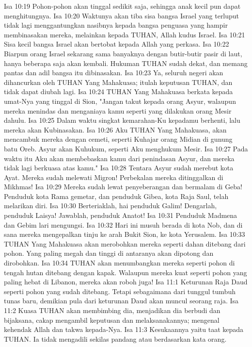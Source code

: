 Isa 10:19  Pohon-pohon akan tinggal sedikit saja, sehingga anak kecil pun dapat menghitungnya.
Isa 10:20  Waktunya akan tiba sisa bangsa Israel yang terluput tidak lagi menggantungkan nasibnya kepada bangsa penguasa yang hampir membinasakan mereka, melainkan kepada TUHAN, Allah kudus Israel.
Isa 10:21  Sisa kecil bangsa Israel akan bertobat kepada Allah yang perkasa.
Isa 10:22  Biarpun orang Israel sekarang sama banyaknya dengan butir-butir pasir di laut, hanya beberapa saja akan kembali. Hukuman TUHAN sudah dekat, dan memang pantas dan adil bangsa itu dibinasakan.
Isa 10:23  Ya, seluruh negeri akan dihancurkan oleh TUHAN Yang Mahakuasa; itulah keputusan TUHAN, dan tidak dapat diubah lagi.
Isa 10:24  TUHAN Yang Mahakuasa berkata kepada umat-Nya yang tinggal di Sion, "Jangan takut kepada orang Asyur, walaupun mereka menindas dan menganiaya kamu seperti yang dilakukan orang Mesir dahulu.
Isa 10:25  Dalam waktu singkat kemarahan-Ku kepadamu berhenti, lalu mereka akan Kubinasakan.
Isa 10:26  Aku TUHAN Yang Mahakuasa, akan mencambuk mereka dengan cemeti, seperti Kuhajar orang Midian di gunung batu Oreb. Asyur akan Kuhukum, seperti Aku menghukum Mesir.
Isa 10:27  Pada waktu itu Aku akan membebaskan kamu dari penindasan Asyur, dan mereka tidak lagi berkuasa atas kamu."
Isa 10:28  Tentara Asyur sudah merebut kota Ayat. Mereka sudah melewati Migron! Perbekalan mereka ditinggalkan di Mikhmas!
Isa 10:29  Mereka sudah lewat penyeberangan dan bermalam di Geba! Penduduk kota Rama gemetar, dan penduduk Gibea, kota Raja Saul, telah melarikan diri.
Isa 10:30  Berteriaklah, hai penduduk Galim! Dengarlah, penduduk Laisya! Jawablah, penduduk Anatot!
Isa 10:31  Penduduk Madmena dan Gebim lari mengungsi.
Isa 10:32  Hari ini musuh berada di kota Nob, dan di sana mereka mengepalkan tinju ke arah Bukit Sion, ke kota Yerusalem.
Isa 10:33  TUHAN Yang Mahakuasa akan merobohkan mereka seperti dahan ditebang dari pohon. Yang paling megah dan tinggi di antaranya akan dipotong dan dirobohkan.
Isa 10:34  TUHAN akan menumbangkan mereka seperti pohon di tengah hutan ditebang dengan kapak. Walaupun mereka kuat seperti pohon yang paling hebat di Libanon, mereka akan roboh juga!
Isa 11:1  Keturunan Raja Daud seperti pohon yang sudah ditebang. Tetapi sebagaimana dari tunggul tumbuh tunas baru, demikian pula dari keturunan Daud akan muncul seorang raja.
Isa 11:2  Kuasa TUHAN akan membimbing dia, menjadikan dia berbudi dan bijaksana, cakap mengambil keputusan dan melaksanakannya; mengenal kehendak Allah dan takwa kepada-Nya.
Isa 11:3  Kesukaannya yaitu taat kepada TUHAN. Ia tidak mengadili sekilas pandang atau berdasarkan kata orang.
